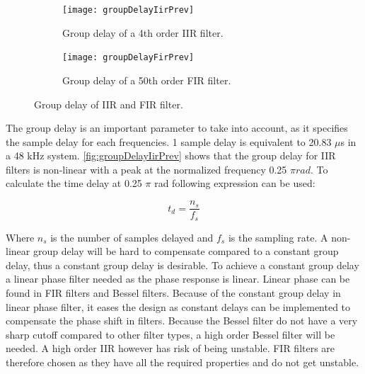 \begin{figure}[H]
\centering
\begin{subfigure}[t]{0.435\textwidth}
\texttt{[image: groupDelayIirPrev]}
	\caption{Group delay of a 4th order IIR filter.}
	\label{fig:groupDelayIirPrev}
\end{subfigure}
\hspace{6mm} 
\begin{subfigure}[t]{0.47\textwidth}
\texttt{[image: groupDelayFirPrev]}
	\caption{Group delay of a 50th order FIR filter.}
	\label{fig:groupDelayFirPrev}
\end{subfigure}
\caption{Group delay of IIR and FIR filter.}
\label{fig:filterGroupDelay}
\end{figure}

The group delay is an important parameter to take into account, as it specifies the sample delay for each frequencies. 1 sample delay is equivalent to 20.83 $\mu$s in a 48 kHz system. \autoref{fig:groupDelayIirPrev} shows that the group delay for IIR filters is non-linear with a peak at the normalized frequency 0.25 $\pi rad$. To calculate the time delay at 0.25 $\pi$ rad following expression can be used:

\begin{equation}
t_{d}= \frac{n_{s}}{f_s}
\end{equation}

Where $n_{s}$ is the number of samples delayed and $f_s$ is the sampling rate. A non-linear group delay will be hard to compensate compared to a constant group delay, thus a constant group delay is desirable. To achieve a constant group delay a linear phase filter needed as the phase response is linear. Linear phase can be found in FIR filters and Bessel filters. Because of the constant group delay in linear phase filter, it eases the design as constant delays can be implemented to compensate the phase shift in filters. Because the Bessel filter do not have a very sharp cutoff compared to other filter types, a high order Bessel filter will be needed. A high order IIR however has risk of being unstable. FIR filters are therefore chosen as they have all the required properties and do not get unstable.



